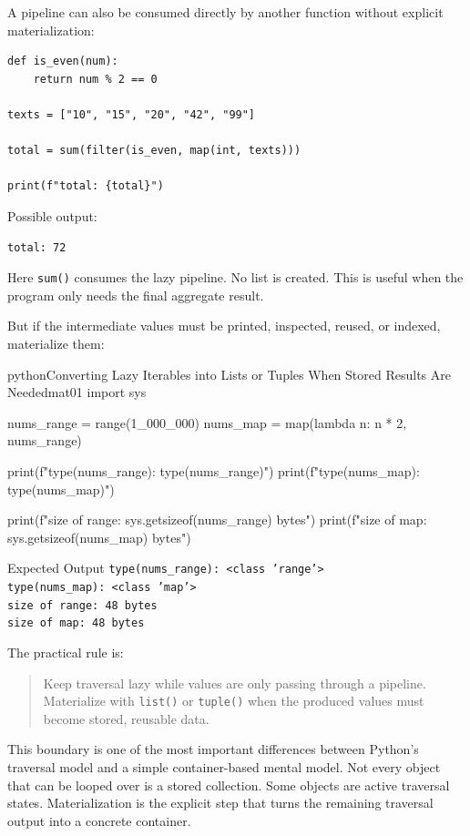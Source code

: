A pipeline can also be consumed directly by another function without explicit materialization:

\begin{verbatim}
def is_even(num):
    return num % 2 == 0

texts = ["10", "15", "20", "42", "99"]

total = sum(filter(is_even, map(int, texts)))

print(f"total: {total}")
\end{verbatim}

Possible output:

\begin{verbatim}
total: 72
\end{verbatim}

Here \texttt{sum()} consumes the lazy pipeline. No list is created. This is useful when the program only needs the final aggregate result.

But if the intermediate values must be printed, inspected, reused, or indexed, materialize them:

\begin{codebox}[]{python}{Converting Lazy Iterables into Lists or Tuples When Stored Results Are Needed}{mat01}
import sys

nums_range = range(1_000_000)
nums_map = map(lambda n: n * 2, nums_range)

print(f"type(nums_range): {type(nums_range)}")
print(f"type(nums_map): {type(nums_map)}")

print(f"size of range: {sys.getsizeof(nums_range)} bytes")
print(f"size of map:   {sys.getsizeof(nums_map)} bytes")
\end{codebox}


\begin{iobox}{Expected Output}
\texttt{type(nums\_range): <class 'range'>} \\
\texttt{type(nums\_map): <class 'map'>} \\
\texttt{size of range: 48 bytes} \\
\texttt{size of map:   48 bytes} \\
\end{iobox}




The practical rule is:

\begin{quote}
Keep traversal lazy while values are only passing through a pipeline. Materialize with \texttt{list()} or \texttt{tuple()} when the produced values must become stored, reusable data.
\end{quote}

This boundary is one of the most important differences between Python's traversal model and a simple container-based mental model. Not every object that can be looped over is a stored collection. Some objects are active traversal states. Materialization is the explicit step that turns the remaining traversal output into a concrete container.